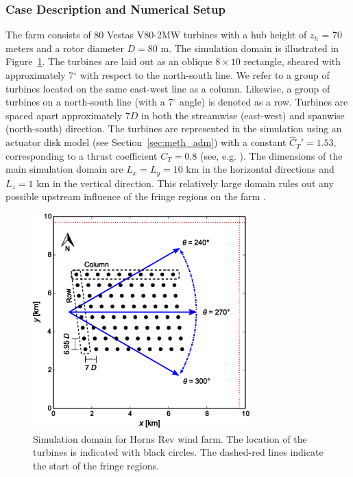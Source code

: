 		\subsubsection{Case Description and Numerical Setup}
		
		The farm consists of 80 Vestas V80-2MW turbines with a hub height of $z_h$ = 70 meters and a rotor diameter $D = 80$ m. The simulation
		domain is illustrated in Figure~\ref{fig:hornsrevlayout}.  The turbines are laid out as an oblique $8 \times 10$ rectangle, sheared with
		approximately 7$^\circ$ with respect to the north-south line. We refer to a group of turbines located on the same east-west line as a
		column. Likewise, a group of turbines on a north-south line (with a 7$^\circ$ angle) is denoted as a row. Turbines are spaced apart
		approximately 7$D$ in both the streamwise (east-west) and spanwise (north-south) direction. The turbines are represented in the
		simulation using an actuator disk model (see Section~\ref{sec:meth_adm}) with a constant $\widehat{C}_T' = 1.53$, corresponding to a
		thrust coefficient $C_T = 0.8$ (see, e.g. \citealp{wu2015modeling,stevens2015using}). The  dimensions of the main simulation domain are $L_x = L_y = 10$ km in the horizontal directions and $L_z = 1$ km in the vertical direction. This relatively large domain
		rules out any possible upstream influence of the fringe regions on the farm \citep{lundbladh1999efficient,nordstrom1999fringe}.
		
		\begin{figure}[h]
			\centering
			\includegraphics[width=0.75\textwidth]{chapters/turbulent_inflow/blm/figure9.eps}
			\caption{Simulation domain for Horns Rev wind farm. The location of the turbines is indicated with black circles. The dashed-red lines indicate the start of the fringe regions.}
			\label{fig:hornsrevlayout}
		\end{figure}


